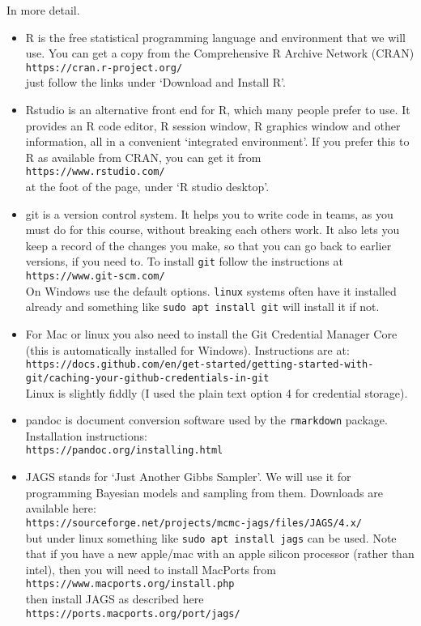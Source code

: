 \documentclass[10pt] {article}
\theoremstyle{definition}
\begin{document}
In more detail.
\begin{itemize}
\item R is the free statistical programming language and environment that we will use. You can get a copy from the Comprehensive R Archive Network (CRAN)\\
\verb+https://cran.r-project.org/+\\
just follow the links under `Download and Install R'. 
\item Rstudio is an alternative front end for R, which many people prefer to use. It provides an R code editor, R session window, R graphics window and other information, all in a convenient `integrated environment'. If you prefer this to R as available from CRAN, you can get it from\\
\verb+https://www.rstudio.com/+\\
at the foot of the page, under `R studio desktop'. 
\item git is a version control system. It helps you to write code in teams, as you must do for this course, without breaking each others work. It also lets you keep a record of the changes you make, so that you can go back to earlier versions, if you need to. To install {\tt git} follow the instructions at\\
\verb+https://www.git-scm.com/+\\
On Windows use the default options. {\tt linux} systems often have it installed already and something like \verb+sudo apt install git+ will install it if not. 
\item For Mac or linux you also need to install the Git Credential Manager Core (this is automatically installed for Windows). Instructions are at:\\
{\scriptsize \verb+https://docs.github.com/en/get-started/getting-started-with-git/caching-your-github-credentials-in-git+}\\
Linux is slightly fiddly (I used the plain text option 4 for credential storage). 
\item pandoc is document conversion software used by the {\tt rmarkdown} package. Installation instructions:\\
\verb+https://pandoc.org/installing.html+ 
\item JAGS stands for `Just Another Gibbs Sampler'. We will use it for programming Bayesian models and sampling from them. Downloads are available here:\\
\verb+https://sourceforge.net/projects/mcmc-jags/files/JAGS/4.x/+\\
but under linux something like \verb+sudo apt install jags+ can be used. Note that if you have a new apple/mac with an apple silicon processor (rather than intel), then you will need to install MacPorts from\\ 
\verb+https://www.macports.org/install.php+\\
then install JAGS as described here\\
\verb+https://ports.macports.org/port/jags/+
\end{itemize}
\end{document}
